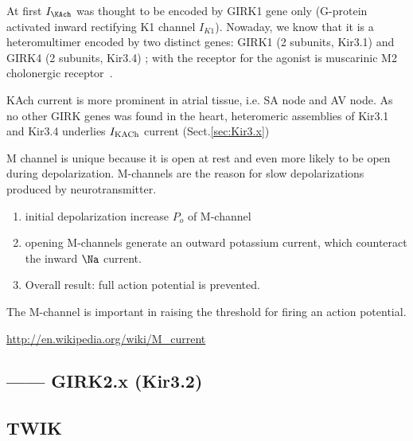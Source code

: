    

At first $I_\KAch$ was thought to be encoded by GIRK1 gene only (G-protein
activated inward rectifying K1 channel $I_{K1}$)\citep{costa2005}. Nowaday, we
know that it is a heteromultimer encoded by two distinct genes: GIRK1 (2
subunits, Kir3.1) and GIRK4 (2 subunits, Kir3.4) \citep{krapivinsky1994}; with
the receptor for the agonist is muscarinic M2 cholonergic receptor~\citep{soejima1984}.

KAch current is more prominent in atrial tissue, i.e. SA node and AV node.
As no other GIRK genes was found in the heart, heteromeric assemblies of Kir3.1
and Kir3.4 underlies $I_{\ce{KACh}}$ current (Sect.\ref{sec:Kir3.x})


M channel is unique because it is open at rest and even more likely to be open
during depolarization. M-channels are the reason for slow depolarizations
produced by neurotransmitter.
\begin{enumerate}
  \item initial depolarization increase $P_o$ of M-channel
  \item opening M-channels generate an outward potassium current, which 
  counteract the inward $\Na$ current. 
  
  \item Overall result: full action potential is   prevented.
\end{enumerate}
The M-channel is important in raising the threshold for firing an action
potential. 

\url{http://en.wikipedia.org/wiki/M_current}



\subsection{------ GIRK2.x (Kir3.2)}
\label{sec:GIRK2.x}








\subsection{TWIK}

